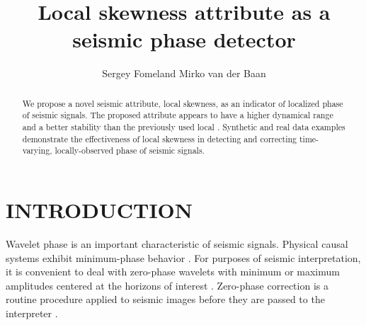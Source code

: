 

\title{Local skewness attribute as a seismic phase detector}

\renewcommand{\thefootnote}{\fnsymbol{footnote}}
\newcommand{\arccosh}{\mbox{arccosh}}


\author{Sergey Fomel\footnotemark[1]
and Mirko van der Baan\footnotemark[2]}

\address{
\footnotemark[1]Bureau of Economic Geology, \\
John A. and Katherine G. Jackson School of Geosciences \\
The University of Texas at Austin \\
University Station, Box X \\
Austin, TX 78713-8924 \\
USA \\
sergey.fomel@beg.utexas.edu \\
\footnotemark[2]Department of Physics \\
University of Alberta \\
CEB 11322 - 89 Avenue \\
Edmonton, Alberta T6G 2G7 \\
Canada \\
Mirko.VanderBaan@ualberta.ca
}

\maketitle

\begin{abstract}
  We propose a novel seismic attribute, local skewness, as an indicator
  of localized phase of seismic signals. The proposed attribute
  appears to have a higher dynamical range and a better stability than
  the previously used local  . Synthetic and real data
  examples demonstrate the effectiveness of local skewness in
  detecting and correcting time-varying, locally-observed phase of
  seismic signals.
\end{abstract}

\section{INTRODUCTION}

Wavelet phase is an important characteristic of seismic
signals. Physical causal systems exhibit minimum-phase behavior
\cite[]{robinson}. For purposes of seismic interpretation, it is
convenient to deal with zero-phase wavelets with minimum or maximum
amplitudes centered at the horizons of interest . Zero-phase
correction is  a routine procedure applied to seismic
images before they are passed to the interpreter \cite[]{brown}.

